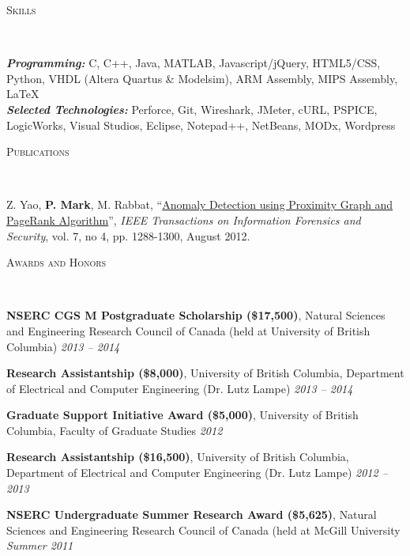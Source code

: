 \documentclass[10pt]{article}
\newenvironment{changemargin}[2]{%
  \begin{list}{}{%
    \setlength{\topsep}{0pt}%
    \setlength{\leftmargin}{#1}%
    \setlength{\rightmargin}{#2}%
    \setlength{\listparindent}{\parindent}%
    \setlength{\itemindent}{\parindent}%
    \setlength{\parsep}{\parskip}%
  }%
  \item[]}{\end{list}
}
\newcommand{\lineover}{
  \begin{changemargin}{-0.05in}{-0.05in}
    \vspace*{-8pt}
    \hrulefill \\
    \vspace*{-2pt}
  \end{changemargin}
}
\renewcommand{\section}[1]{
  \begin{changemargin}{-0.5in}{-0.5in}
    \normalsize \scshape{#1}\\
    \lineover
  \end{changemargin}
}
\newenvironment{body} {
  \vspace{2pt}
  \begin{changemargin}{-0.25in}{-0.5in}
    }{
  \end{changemargin}
}
\newcommand{\itemdescription}[3]{
  \textbf{#1}, {#2} \hfill \emph{#3}\\
  \medskip
}
\begin{document}
\section{Skills}
\begin{body}
\emph{\textbf{Programming:}}{} C, C++, Java, MATLAB, Javascript/jQuery,
HTML5/CSS, Python, VHDL (Altera Quartus \& Modelsim), ARM Assembly, MIPS 
Assembly, \LaTeX\\
\medskip
\emph{\textbf{Selected Technologies:}}{} Perforce, Git, Wireshark, JMeter, cURL,
PSPICE, LogicWorks, Visual Studios, Eclipse, Notepad++, NetBeans, MODx,
Wordpress\\
\end{body}
\bigskip

\section{Publications}
\begin{body}
Z. Yao, \textbf{P. Mark}, M. Rabbat, 
``\href{http://ieeexplore.ieee.org/xpl/articleDetails.jsp?arnumber=6175122}
{Anomaly Detection using Proximity Graph and PageRank Algorithm}'', \emph{IEEE 
Transactions on Information Forensics and Security}, vol. 7, no 4, pp. 
1288-1300, August 2012.
\end{body}
\bigskip

\section{Awards and Honors}
\begin{body}
\itemdescription{NSERC CGS M Postgraduate Scholarship (\$17,500)}{Natural 
Sciences and Engineering Research Council of Canada (held at University of
British Columbia)}{2013 -- 2014}
\itemdescription{Research Assistantship (\$8,000)}{University of British
Columbia, Department of Electrical and Computer Engineering (Dr. Lutz
Lampe)}{2013 -- 2014}
\itemdescription{Graduate Support Initiative Award (\$5,000)}{University of
British Columbia, Faculty of Graduate Studies}{2012}
\itemdescription{Research Assistantship (\$16,500)}{University of British 
Columbia, Department of Electrical and Computer Engineering (Dr. Lutz 
Lampe)}{2012 -- 2013}
\itemdescription{NSERC Undergraduate Summer Research Award (\$5,625)}{Natural 
Sciences and Engineering Research Council of Canada (held at McGill
University}{Summer 2011}
\end{body}
\medskip
\end{document}
